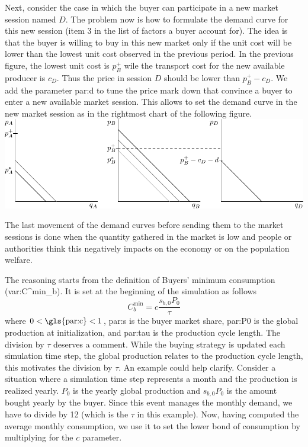 \documentclass{article}
\begin{document}
Next, consider the case in which the buyer can participate in a new market session named $D$. The problem now is how to formulate the demand curve for this new session (item 3 in the list of factors a buyer account for). The idea is that the buyer is willing to buy in this new market only if the unit cost will be lower than the lowest unit cost observed in the previous period. In the previous figure, the lowest unit cost is $p^+_B$ wile the transport cost for the new available producer is $c_D$. Thus the price in session $D$ should be lower than $p^+_B-c_D$. We add the parameter \gls{par:d} to tune the price mark down that convince a buyer to enter a new available market session. This allows to set the demand curve in the new market session as in the rightmost chart of the following figure. 
\vskip5mm
\hskip-1.5cm
\includegraphics{fig_buying_strategy-3.pdf}


\vskip5mm
The last movement of the demand curves before sending them to the market sessions is done when the quantity gathered in the market is low and people or authorities think this negatively impacts on the economy or on the population welfare. 

The reasoning starts from the definition of Buyers' minimum consumption (\gls{var:C^min_b}). It  is set at the beginning of the simulation as follows 
\[C^{\min}_b=c\frac{s_{b,0}P_0}{\tau}\]
where $0<\textnormal{\gls{par:c}}<1$, \gls{par:s} is the buyer market share, \gls{par:P0} is the global production at initialization, and \gls{par:tau} is the production cycle length. 
The division by $\tau$ deserves a comment. While the buying strategy is updated each simulation time step, the global production relates to the production cycle length, this motivates the division by $\tau$. An example could help clarify. Consider a situation where a simulation time step represents a month and the production is realized yearly. $P_0$ is the yearly global production and $s_{b,0}P_0$ is the amount bought yearly by the buyer. Since this event manages the monthly demand, we have to divide by 12 (which is the $\tau$ in this example). Now, having computed the average monthly consumption, we use it to set the lower bond of consumption by multiplying for the $c$ parameter.   
\end{document}
